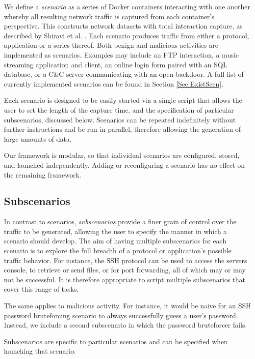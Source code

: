 We define a \emph{scenario} as a series of Docker containers interacting with one another whereby all resulting network traffic is captured from each container's perspective. This constructs network datasets with total interaction capture, as described by Shiravi et al. \cite{shiravi2012toward}. Each scenario produces traffic from either a protocol, application or a series thereof. Both benign and malicious activities are implemented as scenarios. Examples may include an FTP interaction, a music streaming application and client, an online login form paired with an SQL database, or a C\&C server communicating with an open backdoor. A full list of currently implemented scenarios can be found in Section \ref{Sec:ExistScen}.

Each scenario is designed to be easily started via a single script that allows the user to set the length of the capture time, and the specification of particular subscenarios, discussed below. Scenarios can be repeated indefinitely without further instructions and be run in parallel, therefore allowing the generation of large amounts of data.

Our framework is modular, so that individual scenarios are configured, stored, and launched independently. Adding or reconfiguring a scenario has no effect on the remaining framework.

\subsection{Subscenarios} \label{Sec:Subscenarios}

In contrast to scenarios, \textit{subscenarios} provide a finer grain of control over the traffic to be generated, allowing the user to specify the manner in which a scenario should develop. The aim of having multiple subscenarios for each scenario is to explore the full breadth of a protocol or application's possible traffic behavior. For instance, the SSH protocol can be used to access the servers console, to retrieve or send files, or for port forwarding, all of which may or may not be successful. It is therefore appropriate to script multiple subscenarios that cover this range of tasks.

The same applies to malicious activity. For instance, it would be naive for an SSH password bruteforcing scenario to always successfully guess a user's password. Instead, we include a second subscenario in which the password bruteforcer fails.

Subscenarios are specific to particular scenarios and can be specified when launching that scenario.

